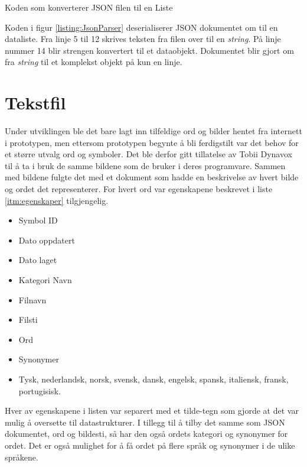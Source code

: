 \begin{listing}[ht] 
\inputminted[fontsize=\footnotesize, frame=lines,framesep=2mm,baselinestretch=1.2,bgcolor=lightgray,linenos]{csharp}{Code/JSONparser.cs} 
\caption{Koden som konverterer JSON filen til en Liste} 
\label{listing:JsonParser} 
\end{listing} 


Koden i figur \ref{listing:JsonParser} deserialiserer JSON dokumentet om til en dataliste. Fra linje 5 til 12 skrives teksten fra filen over til en \textit{string}. På linje nummer 14 blir strengen konvertert til et dataobjekt. Dokumentet blir gjort om fra \textit{string} til et komplekst objekt på kun en linje. 


\section{Tekstfil}

Under utviklingen ble det bare lagt inn tilfeldige ord og bilder hentet fra internett i prototypen, men ettersom prototypen begynte å bli ferdigstilt var det behov for et større utvalg ord og symboler. Det ble derfor gitt tillatelse av Tobii Dynavox til å ta i bruk de samme bildene som de bruker i deres programvare. Sammen med bildene fulgte det med et dokument som hadde en beskrivelse av hvert bilde og ordet det representerer. For hvert ord var egenskapene beskrevet i liste \ref{itm:egenskaper} tilgjengelig. 

\begin{itemize}
\label{itm:egenskaper}
\item Symbol ID
\item Dato oppdatert
\item Dato laget
\item Kategori Navn 
\item Filnavn
\item Filsti
\item Ord
\item Synonymer
\item Tysk, nederlandsk, norsk, svensk, dansk, engelsk, spansk, italiensk, fransk, portugisisk.
\end{itemize}


Hver av egenskapene i listen var separert med et tilde-tegn som gjorde at det var mulig å oversette til datastrukturer. I tillegg til å tilby det samme som JSON dokumentet, ord og bildesti, så har den også ordets kategori og synonymer for ordet. Det er også mulighet for å få ordet på flere språk og synonymer i de ulike språkene. 

